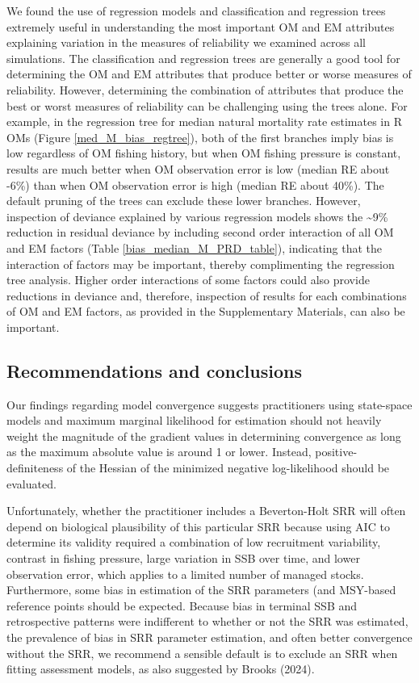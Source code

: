 \documentclass[
  12pt,
]{article}
\begin{document}
We found the use of regression models and classification and regression
trees extremely useful in understanding the most important OM and EM
attributes explaining variation in the measures of reliability we
examined across all simulations. The classification and regression trees
are generally a good tool for determining the OM and EM attributes that
produce better or worse measures of reliability. However, determining
the combination of attributes that produce the best or worst measures of
reliability can be challenging using the trees alone. For example, in
the regression tree for median natural mortality rate estimates in R OMs
(Figure \ref{med_M_bias_regtree}), both of the first branches imply bias
is low regardless of OM fishing history, but when OM fishing pressure is
constant, results are much better when OM observation error is low
(median RE about -6\%) than when OM observation error is high (median RE
about 40\%). The default pruning of the trees can exclude these lower
branches. However, inspection of deviance explained by various
regression models shows the \textasciitilde9\% reduction in residual
deviance by including second order interaction of all OM and EM factors
(Table \ref{bias_median_M_PRD_table}), indicating that the interaction
of factors may be important, thereby complimenting the regression tree
analysis. Higher order interactions of some factors could also provide
reductions in deviance and, therefore, inspection of results for each
combinations of OM and EM factors, as provided in the Supplementary
Materials, can also be important.

\subsection*{Recommendations and
conclusions}\label{recommendations-and-conclusions}

Our findings regarding model convergence suggests practitioners using
state-space models and maximum marginal likelihood for estimation should
not heavily weight the magnitude of the gradient values in determining
convergence as long as the maximum absolute value is around 1 or lower.
Instead, positive-definiteness of the Hessian of the minimized negative
log-likelihood should be evaluated.

Unfortunately, whether the practitioner includes a Beverton-Holt SRR
will often depend on biological plausibility of this particular SRR
because using AIC to determine its validity required a combination of
low recruitment variability, contrast in fishing pressure, large
variation in SSB over time, and lower observation error, which applies
to a limited number of managed stocks. Furthermore, some bias in
estimation of the SRR parameters (and MSY-based reference points should
be expected. Because bias in terminal SSB and retrospective patterns
were indifferent to whether or not the SRR was estimated, the prevalence
of bias in SRR parameter estimation, and often better convergence
without the SRR, we recommend a sensible default is to exclude an SRR
when fitting assessment models, as also suggested by Brooks (2024).
\end{document}
